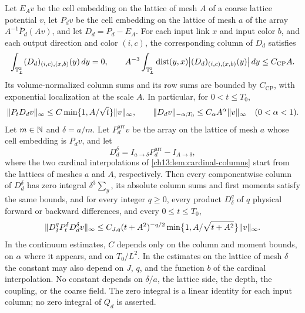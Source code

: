 \begin{lemma}
Let $E_Av$ be the cell embedding on the lattice of mesh $A$ of a coarse lattice potential $v$, let $P_dv$ be the cell embedding on the lattice of mesh $a$ of the array $A^{-1}\overline P_d(Av)$, and let $D_d=P_d-E_A$. For each input link $x$ and input color $b$, and each output direction and color $(i,c)$, the corresponding column of $D_d$ satisfies
\[
 \int_{\mathbb T_L^3}(D_d)_{(i,c),(x,b)}(y)\,dy=0,\qquad A^{-3}\int_{\mathbb T_L^3}\operatorname{dist}(y,x)\bigl\lvert(D_d)_{(i,c),(x,b)}(y)\bigr\rvert\,dy\le C_{\mathrm{CP}}A.
\]
Its volume-normalized column sums and its row sums are bounded by $C_{\mathrm{CP}}$, with exponential localization at the scale $A$. In particular, for $0<t\le T_0$,
\[
 \lVert P_tD_dv\rVert_\infty\le C\min\{1,A/\sqrt t\}\lVert v\rVert_\infty,\qquad\lVert D_dv\rVert_{-\alpha;T_0}\le C_\alpha A^\alpha\lVert v\rVert_\infty\quad(0<\alpha<1).
\]
Let $m\in\mathbb N$ and $\delta=a/m$. Let $P_d^{\mathrm{arr}}v$ be the array on the lattice of mesh $a$ whose cell embedding is $P_dv$, and let
\[
 D_d^\delta=I_{a\to\delta}P_d^{\mathrm{arr}}-I_{A\to\delta},
\]
where the two cardinal interpolations of \cref{ch13:lem:cardinal-columns} start from the lattices of meshes $a$ and $A$, respectively. Then every componentwise column of $D_d^\delta$ has zero integral $\delta^3\sum_y$, its absolute column sums and first moments satisfy the same bounds, and for every integer $q\ge0$, every product $D_\delta^q$ of $q$ physical forward or backward differences, and every $0\le t\le T_0$,
\[
 \lVert D_\delta^qP_t^\delta D_d^\delta v\rVert_\infty\le C_{J,q}(t+A^2)^{-q/2}\min\bigl\{1,A/\sqrt{t+A^2}\bigr\}\lVert v\rVert_\infty.
\]
In the continuum estimates, $C$ depends only on the column and moment bounds, on $\alpha$ where it appears, and on $T_0/L^2$. In the estimates on the lattice of mesh $\delta$ the constant may also depend on $J$, $q$, and the function $b$ of the cardinal interpolation. No constant depends on $\delta/a$, the lattice side, the depth, the coupling, or the coarse field. The zero integral is a linear identity for each input column; no zero integral of $\overline Q_d$ is asserted.
\end{lemma}

